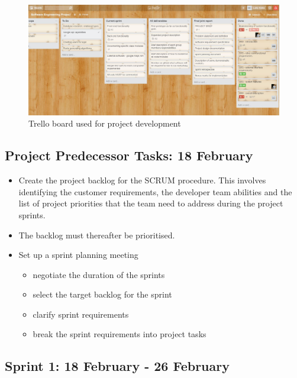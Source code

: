 \documentclass[10pt,twocolumn]{witseiepaper}
\begin{document}
	\begin{figure}[h!]
		\centering
		\includegraphics[width = \columnwidth]{../images/Trello.JPG}
		\caption{Trello board used for project development}
		\label{trello}
	\end{figure}
	
	\subsection{Project Predecessor Tasks: 18 February}
	
	\begin{itemize}
		\item Create the project backlog for the SCRUM procedure. This involves identifying the customer requirements, the developer team abilities and the list of project priorities that the team need to address during the project sprints. 
		\item The backlog must thereafter be prioritised. 
		\item Set up a sprint planning meeting
		\begin{itemize}
			\item negotiate the duration of the sprints 
			\item select the target backlog for the sprint
			\item clarify sprint requirements
			\item break the sprint requirements into project tasks
		\end{itemize}
	\end{itemize}
	
	\subsection{Sprint 1: 18 February - 26 February}
	
\end{document}
